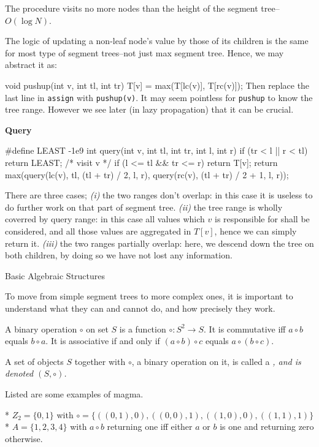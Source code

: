 The procedure visits no more nodes than the height of the segment tree--$O(\log N)$.

The logic of updating a non-leaf node's value by those of its children is the same for most type of segment trees--not just max segment tree.  Hence, we may abstract it as:

\begtt
void pushup(int v, int tl, int tr) {
    T[v] = max(T[lc(v)], T[rc(v)]);
  }
\endtt
Then replace the last line in {\tt assign} with {\tt pushup(v)}.  It may seem pointless for {\tt pushup} to know the tree range.  However we see later (in lazy propagation) that it can be crucial.

  {\bf Query}


\begtt
#define LEAST -1e9
int query(int v, int tl, int tr, int l, int r) {
    if (tr < l || r < tl) return LEAST;
    /* visit v */
    if (l <= tl && tr <= r) return T[v];
    return max(query(lc(v), tl, (tl + tr) / 2, l, r),
    query(rc(v), (tl + tr) / 2 + 1, l, r));
  }
\endtt

There are three cases; {\it (i)\/} the two ranges don't overlap: in this case it is useless to do further work on that part of segment tree. {\it (ii)\/} the tree range is wholly coverred by query range: in this case all values which $v$ is responsible for shall be considered, and all those values are aggregated in $T[v]$, hence we can simply return it. {\it (iii)\/} the two ranges partially overlap: here, we descend down the tree on both children, by doing so we have not lost any information.

\secc Basic Algebraic Structures

To move from simple segment trees to more complex ones, it is important to understand what they can and cannot do, and how precisely they work.

A binary operation $\circ$ on set $S$ is a function $\circ : S^2 \rightarrow S$.  It is commutative iff $a \circ b$ equals $b \circ a$.
It is associative if and only if $(a \circ b) \circ c$ equals $a \circ (b \circ c)$.

A set of objects $S$ together with $\circ$, a binary operation on it, is called a \it {} \rm, and is denoted $(S, \circ)$.

Listed are some examples of magma.

\begitems
* $Z_2 = \{ 0, 1 \}$ with $\circ = \{ ((0, 1), 0), ((0, 0), 1), ((1, 0), 0), ((1, 1), 1) \}$
* $A = \{ 1, 2, 3, 4 \}$ with $a \circ b$ returning one iff either $a$ or $b$ is one and returning zero otherwise.
\enditems

